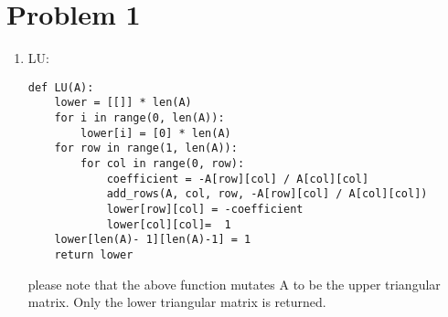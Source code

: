 \documentclass{article}
\title{\thetitle}
\author{\theauthor}
\begin{document}
\maketitle
\section* {Problem 1}
\begin{enumerate}
\item LU:
\begin{lstlisting}
def LU(A):
    lower = [[]] * len(A)
    for i in range(0, len(A)):
        lower[i] = [0] * len(A)
    for row in range(1, len(A)):
        for col in range(0, row):
            coefficient = -A[row][col] / A[col][col]
            add_rows(A, col, row, -A[row][col] / A[col][col])
            lower[row][col] = -coefficient
            lower[col][col]=  1
    lower[len(A)- 1][len(A)-1] = 1
    return lower
\end{lstlisting}
please note that the above function mutates A to be the upper triangular matrix. Only the lower triangular matrix is returned. 


\end{enumerate}
\end{document}
